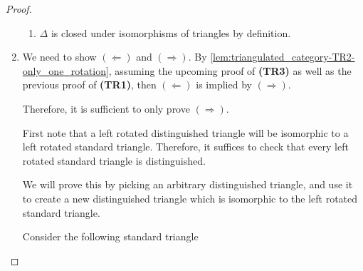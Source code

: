 \begin{proof}
\begin{enumerate}[label={(\bfseries TR\arabic*)}]
{\begin{enumerate}
{\begin{center}
                    \end{center}
                    Since the pushout of an isomorphism is an isomorphism, \( \gamma_{\Id} \) is an isomorphism, which implies \( C_{\Id} \cong 0 \) in \( \Mc \) because all injective modules are projective in \( \Mc \). This yields the trivial triangle.
                }
                \item {
                    \( \Delta \) is closed under isomorphisms of triangles by definition.
                }
            \end{enumerate}
        }
        \item {
            We need to show \( (\Leftarrow) \) and \( (\Rightarrow) \). By \autoref{lem:triangulated_category-TR2-only_one_rotation}, assuming the upcoming proof of {\bf (TR3)} as well as the previous proof of {\bf (TR1)}, then \( (\Leftarrow) \) is implied by \( (\Rightarrow) \).
            
            Therefore, it is sufficient to only prove \( (\Rightarrow) \).

            First note that a left rotated distinguished triangle will be isomorphic to a left rotated standard triangle. Therefore, it suffices to check that every left rotated standard triangle is distinguished.
            
            We will prove this by picking an arbitrary distinguished triangle, and use it to create a new distinguished triangle which is isomorphic to the left rotated standard triangle.

            Consider the following standard triangle
            \begin{center}
            \end{center}

}
\end{enumerate}
\end{proof}
